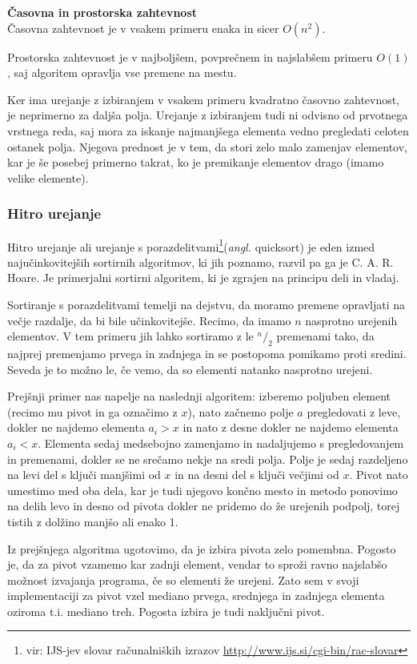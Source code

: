 \documentclass[a4paper,oneside,12pt]{article}
\newcommand{\subsubsubsection}[1]{\vspace*{1ex}\textbf{#1}\\}
\begin{document}
\subsubsubsection{Časovna in prostorska zahtevnost}
Časovna zahtevnost je v vsakem primeru enaka in sicer $O(n^2)$.

Prostorska zahtevnost je v najboljšem, povprečnem in najslabšem primeru $O(1)$, 
saj algoritem opravlja vse premene na mestu.

Ker ima urejanje z izbiranjem v vsakem primeru kvadratno časovno zahtevnost, je neprimerno
za daljša polja. Urejanje z izbiranjem tudi ni odvisno od prvotnega vrstnega reda,
saj mora za iskanje najmanjšega elementa vedno pregledati celoten ostanek polja.
Njegova prednost je v tem, da stori zelo malo zamenjav elementov, kar je še posebej
primerno takrat, ko je premikanje elementov drago (imamo velike elemente).

\subsubsection{Hitro urejanje}
\label{chapter:quicksort}
Hitro urejanje ali urejanje s porazdelitvami\footnote{vir: IJS-jev slovar računalniških izrazov
\url{http://www.ijs.si/cgi-bin/rac-slovar}}(\emph{angl.} quicksort) je eden izmed
najučinkovitejših sortirnih algoritmov, ki jih poznamo, razvil pa ga je C. A. R. Hoare.
Je primerjalni sortirni algoritem, ki je zgrajen na principu deli in vladaj.

Sortiranje s porazdelitvami temelji na dejstvu, da moramo premene opravljati na večje
razdalje, da bi bile učinkovitejše. Recimo, da imamo $n$ nasprotno urejenih elementov.
V tem primeru jih lahko sortiramo z le $^n/_2$ premenami tako, da najprej premenjamo prvega
in zadnjega in se postopoma pomikamo proti sredini. Seveda je to možno le, če vemo, da so 
elementi natanko nasprotno urejeni.

Prejšnji primer nas napelje na naslednji algoritem: 
izberemo poljuben element (recimo mu pivot in ga označimo z $x$), nato začnemo 
polje $a$ pregledovati z leve, dokler ne najdemo elementa $a_i > x$ in nato z desne dokler ne 
najdemo elementa $a_i < x$. Elementa sedaj medsebojno zamenjamo in nadaljujemo s 
pregledovanjem in premenami, dokler se ne srečamo nekje na sredi polja.
Polje je sedaj razdeljeno na levi del s ključi manjšimi od $x$ in na desni del
s ključi večjimi od $x$. Pivot nato umestimo med oba dela, kar je tudi njegovo končno
mesto in metodo ponovimo na delih levo in desno od pivota dokler ne pridemo do že urejenih
podpolj, torej tistih z dolžino manjšo ali enako 1. 

Iz prejšnjega algoritma ugotovimo, da je izbira pivota zelo
pomembna. Pogosto je, da za pivot vzamemo kar zadnji element, vendar to sproži ravno
najslabšo možnost izvajanja programa, če so elementi že urejeni. Zato sem v svoji
implementaciji za pivot vzel mediano prvega, srednjega in zadnjega elementa oziroma t.i.
mediano treh. Pogosta izbira je tudi naključni pivot. 
\end{document}
